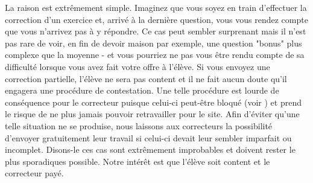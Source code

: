 ﻿La raison est extrêmement simple. Imaginez que vous soyez en train d'effectuer la correction d'un exercice et, arrivé à la dernière question, vous vous rendez compte que vous n'arrivez pas à y répondre. Ce cas peut sembler surprenant mais il n'est pas rare de voir, en fin de devoir maison par exemple, une question "bonus" plus complexe que la moyenne - et vous pourriez ne pas vous être rendu compte de sa difficulté lorsque vous avez fait votre offre à l'élève. Si vous envoyez une correction partielle, l'élève ne sera pas content et il ne fait aucun doute qu'il engagera une procédure de contestation. Une telle procédure est lourde de conséquence pour le correcteur puisque celui-ci peut-être bloqué (voir ) et prend le risque de ne plus jamais pouvoir retravailler pour le site. Afin d'éviter qu'une telle situation ne se produise, nous laissons aux correcteurs la possibilité d'envoyer gratuitement leur travail si celui-ci devait leur sembler imparfait ou incomplet.
Disons-le ces cas sont extrêmement improbables et doivent rester le plus sporadiques possible. Notre intérêt est que l'élève soit content et le correcteur payé.